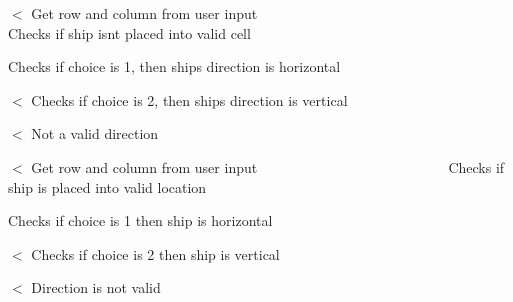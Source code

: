 $<$ Get row and column from user input ~\newline
~\newline
~\newline
~\newline
~\newline
~\newline
~\newline
~\newline
~\newline
~\newline
~\newline
~\newline
~\newline
~\newline
~\newline
~\newline
~\newline
~\newline
~\newline
~\newline
~\newline
 Checks if ship isn\textquotesingle{}t placed into valid cell

Checks if choice is 1, then ship\textquotesingle{}s direction is horizontal

$<$ Checks if choice is 2, then ship\textquotesingle{}s direction is vertical

$<$ Not a valid direction

$<$ Get row and column from user input ~\newline
~\newline
~\newline
~\newline
~\newline
~\newline
~\newline
~\newline
~\newline
~\newline
~\newline
~\newline
~\newline
~\newline
~\newline
~\newline
 Checks if ship is placed into valid location

Checks if choice is 1 then ship is horizontal

$<$ Checks if choice is 2 then ship is vertical

$<$ Direction is not valid

